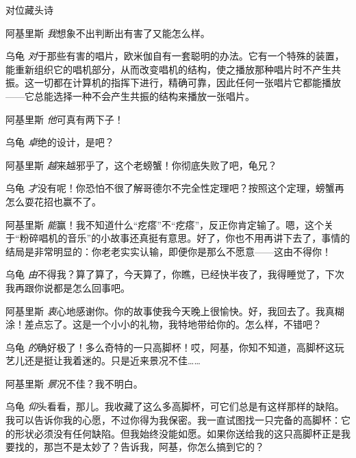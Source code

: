 \begin{dialog}{对位藏头诗}
\begin{dialogue}
\item[阿基里斯]\emph{我}想象不出判断出有害了又能怎么样。

\item[乌龟]\emph{对}于那些有害的唱片，欧米伽自有一套聪明的办法。它有一个特殊的装置，能重新组织它的唱机部分，从而改变唱机的结构，使之播放那种唱片时不产生共振。这一切都在计算机的指挥下进行，精确可靠，因此任何一张唱片它都能播放——它总能选择一种不会产生共振的结构来播放一张唱片。

\item[阿基里斯]\emph{他}可真有两下子！

\item[乌龟]\emph{卓}绝的设计，是吧？

\item[阿基里斯]\emph{越}来越邪乎了，这个老螃蟹！你彻底失败了吧，龟兄？

\item[乌龟]\emph{才}没有呢！你恐怕不很了解哥德尔不完全性定理吧？按照这个定理，螃蟹再怎么耍花招也赢不了。

\item[阿基里斯]\emph{能}赢！我不知道什么“疙瘩”不“疙瘩”，反正你肯定输了。嗯，这个关于“粉碎唱机的音乐”的小故事还真挺有意思。好了，你也不用再讲下去了，事情的结局是非常明显的：你老老实实认输，即便你是那么不愿意——这由不得你！

\item[乌龟]\emph{由}不得我？算了算了，今天算了，你瞧，已经快半夜了，我得睡觉了，下次我再跟你说都是怎么回事吧。

\item[阿基里斯]\emph{衷}心地感谢你。你的故事使我今天晚上很愉快。好，我回去了。我真糊涂！差点忘了。这是一个小小的礼物，我特地带给你的。怎么样，不错吧？

\item[乌龟]\emph{的}确好极了！多么奇特的一只高脚杯！哎，阿基，你知不知道，高脚杯这玩艺儿还是挺让我着迷的。只是近来景况不佳……

\item[阿基里斯]\emph{景}况不佳？我不明白。

\item[乌龟]\emph{仰}头看看，那儿。我收藏了这么多高脚杯，可它们总是有这样那样的缺陷。我可以告诉你我的心愿，不过你得为我保密。我一直试图找一只完备的高脚杯：它的形状必须没有任何缺陷。但我始终没能如愿。如果你送给我的这只高脚杯正是我要找的，那岂不是太妙了？告诉我，阿基，你怎么搞到它的？


\end{dialogue}
\end{dialog}
